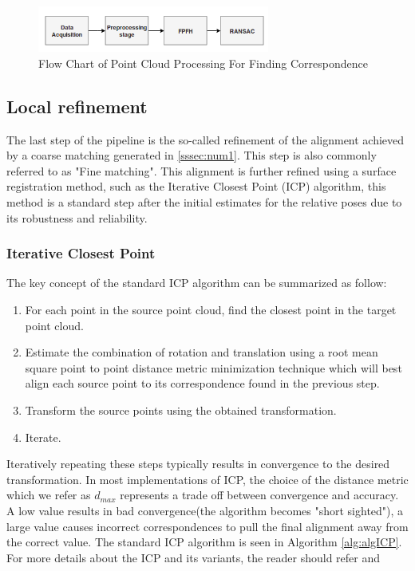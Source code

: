\begin{figure}[!h]
\begin{center}
\includegraphics[width=3in]{diagrams/ransac.png}
\caption{Flow Chart of Point Cloud Processing For Finding Correspondence}
\label{fig:ransac}
\end{center}
\end{figure}
\subsection{Local refinement}

The last step of the pipeline is the so-called refinement of the alignment achieved by a coarse matching generated in \ref{sssec:num1}. This step is also commonly referred to as "Fine matching". This alignment is further refined using a surface registration method, such as the Iterative Closest Point (ICP) algorithm, this method is a standard step after the initial estimates for the relative poses due to its robustness and reliability. 

\subsubsection{Iterative Closest Point}

The  key  concept  of  the  standard  ICP  algorithm  can  be summarized as follow:
\begin{enumerate}
    \item For each point in the source point cloud, find the closest point in the target point cloud.
    \item Estimate the combination of rotation and translation using a root mean square point to point distance metric minimization technique which will best align each source point to its correspondence found in the previous step. 
    \item Transform the source points using the obtained transformation.
    \item Iterate.
\end{enumerate}

Iteratively repeating these steps typically results in convergence to the desired transformation. In most implementations of ICP, the choice of the distance metric which we refer as $d_{max}$ represents a trade off between convergence and accuracy. A low value results in bad convergence(the algorithm becomes "short sighted"), a large value causes incorrect correspondences to pull the final alignment away from the correct value. The standard ICP algorithm is seen in Algorithm \ref{alg:algICP}. For more details about the ICP and its variants, the reader should refer \cite{repMatching} and \cite{algIcp}

